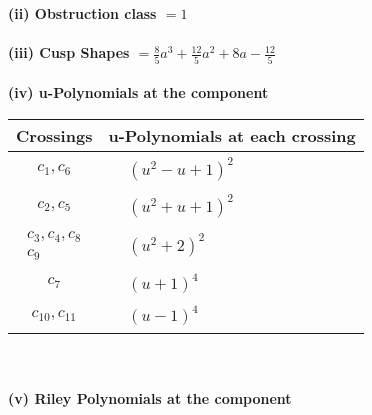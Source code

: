 \documentclass[1p]{elsarticle_modified}
\theoremstyle{definition}
\begin{document}
\flushleft \textbf{(ii) Obstruction class $= 1$}\\~\\
\flushleft \textbf{(iii) Cusp Shapes $= \frac{8}{5} a^3+\frac{12}{5} a^2+8 a-\frac{12}{5}$}\\~\\
\newpage\renewcommand{\arraystretch}{1}
\flushleft \textbf{(iv) u-Polynomials at the component}\newline \\
\begin{tabular}{m{50pt}|m{274pt}}
Crossings & \hspace{64pt}u-Polynomials at each crossing \\
\hline $$\begin{aligned}c_{1},c_{6}\end{aligned}$$&$\begin{aligned}
&(u^2- u+1)^2
\end{aligned}$\\
\hline $$\begin{aligned}c_{2},c_{5}\end{aligned}$$&$\begin{aligned}
&(u^2+u+1)^2
\end{aligned}$\\
\hline $$\begin{aligned}c_{3},c_{4},c_{8}\\c_{9}\end{aligned}$$&$\begin{aligned}
&(u^2+2)^2
\end{aligned}$\\
\hline $$\begin{aligned}c_{7}\end{aligned}$$&$\begin{aligned}
&(u+1)^4
\end{aligned}$\\
\hline $$\begin{aligned}c_{10},c_{11}\end{aligned}$$&$\begin{aligned}
&(u-1)^4
\end{aligned}$\\
\hline
\end{tabular}\\~\\
\newpage\renewcommand{\arraystretch}{1}
\flushleft \textbf{(v) Riley Polynomials at the component}\newline \\
\end{document}
